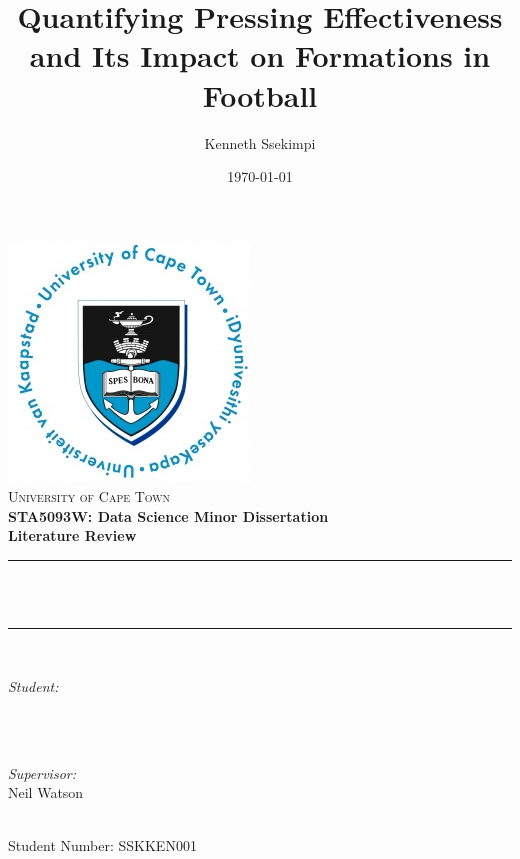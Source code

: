 \documentclass[12pt]{article}
\title{Quantifying Pressing Effectiveness and Its Impact on Formations in Football}
\author{Kenneth Ssekimpi}
\date{\today}
\makeatletter
\let\thetitle\@title
\let\theauthor\@author
\makeatother
\begin{document}

\begin{titlepage}
        \centering
    \vspace*{0.5 cm}
    \includegraphics[scale = 0.75]{UCT Logo.jpg}\\[1.0 cm]
    \textsc{\LARGE University of Cape Town}\\[0.5 cm]	%
    \textbf{\Large STA5093W: Data Science Minor Dissertation}\\[0.5 cm]				%
	\textbf{\large Literature Review}\\[0.5 cm]				%
	\rule{\linewidth}{0.2 mm} \\[0.4 cm]
	{ \huge \bfseries \thetitle}\\
	\rule{\linewidth}{0.2 mm} \\[1.5 cm]
	
	\begin{minipage}{0.4\textwidth}
		\begin{flushleft} \large
			\emph{Student:}\\
			\theauthor \\
			\end{flushleft}
			\end{minipage}~
			\begin{minipage}{0.4\textwidth}
			\begin{flushright} \large
			\emph{Supervisor:} \\
			Neil Watson									
		\end{flushright}
	\end{minipage}\\[2 cm]

Student Number: SSKKEN001 \\

	
\end{titlepage}
\end{document}
